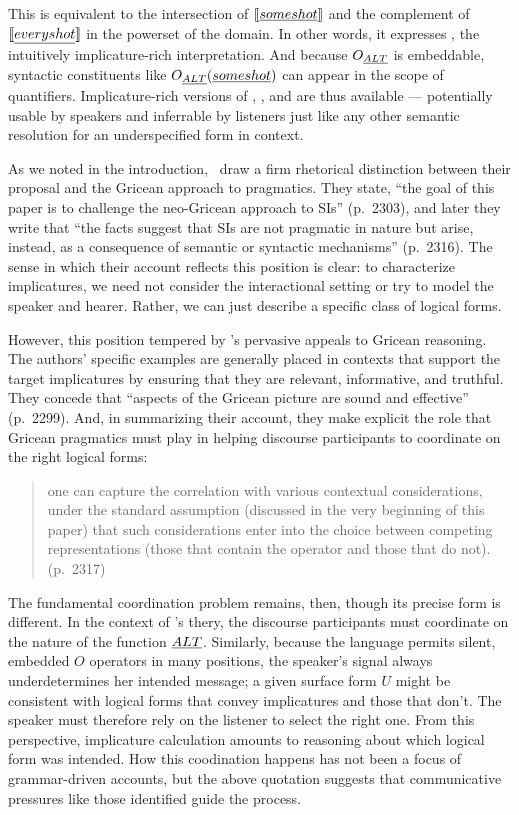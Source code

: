 \documentclass{article}
\begin{document}
%
This is equivalent to the intersection of $\llbracket\emph{some shot}\rrbracket$ and
the complement of $\llbracket\emph{every shot}\rrbracket$ in the powerset of the
domain.  In other words, it expresses , the
intuitively implicature-rich interpretation. And because $O_{\emph{ALT}}$ is
embeddable, syntactic constituents like $O_{\emph{ALT}}(\emph{some shot})$
can appear in the scope of quantifiers.  Implicature-rich versions of
, , and  are thus available
--- potentially usable by speakers and inferrable by listeners just
like any other semantic resolution for an underspecified form in
context.

As we noted in the introduction, \CFS\ draw a firm rhetorical
distinction between their proposal and the Gricean approach to
pragmatics. They state, ``the goal of this paper is to challenge the
neo-Gricean approach to SIs'' (p.~2303), and later they write that
``the facts suggest that SIs are not pragmatic in nature but arise,
instead, as a consequence of semantic or syntactic mechanisms''
(p.~2316). The sense in which their account reflects this position is
clear: to characterize implicatures, we need not consider the
interactional setting or try to model the speaker and hearer. Rather,
we can just describe a specific class of logical forms.

However, this position tempered by \CFS's pervasive appeals to Gricean
reasoning.  The authors' specific examples are generally placed in
contexts that support the target implicatures by ensuring that they
are relevant, informative, and truthful.  They concede that ``aspects
of the Gricean picture are sound and effective'' (p.~2299). And, in
summarizing their account, they make explicit the role that Gricean
pragmatics must play in helping discourse participants to coordinate
on the right logical forms:
%
\begin{quote}
  one can capture the correlation with various contextual
  considerations, under the standard assumption (discussed in the very
  beginning of this paper) that such considerations enter into the
  choice between competing representations (those that contain the
  operator and those that do not). (p.~2317)
\end{quote}

The fundamental coordination problem remains, then, though its precise
form is different. In the context of \CFS's thery, the discourse
participants must coordinate on the nature of the function $\emph{ALT}$.
Similarly, because the language permits silent, embedded $O$ operators
in many positions, the speaker's signal always underdetermines her
intended message; a given surface form $U$ might be consistent with
logical forms that convey implicatures and those that don't. The
speaker must therefore rely on the listener to select the right one.
From this perspective, implicature calculation amounts to reasoning
about which logical form was intended. How this coodination happens
has not been a focus of grammar-driven accounts, but the above
quotation suggests that communicative pressures like those
\citet{Grice75} identified guide the process.
\end{document}
